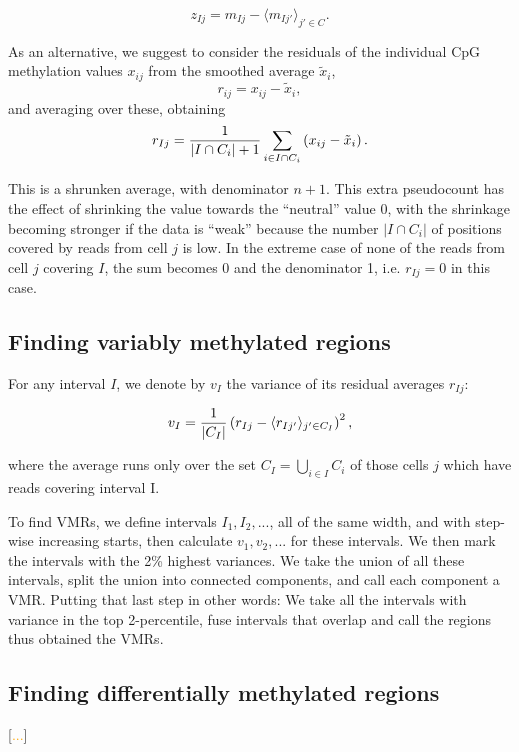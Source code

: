 \documentclass[twocolumn,10pt]{article}
\newcommand{\todo}[1]{[\textcolor{orange}{#1}]}
\begin{document}
$$ z_{Ij} = m_{Ij} - \langle m_{Ij'}\rangle_{j'\in C}.$$

As an alternative, we suggest to consider the residuals of the individual CpG methylation values $x_{ij}$ from the smoothed average $\tilde x_i$,
$$ r_{ij} = x_{ij} - \tilde x_i, $$
and averaging over these, obtaining
\begin{equation} 
r_{Ij} = \frac{\scriptsize{1}}{\scriptsize{|I\cap C_i|+1}}\sum_{i\in I\cap C_i}\left( x_{ij} - \tilde x_i \right).
\label{avgres}
\end{equation}

This is a shrunken average, with denominator $n+1$.
This extra pseudocount has the effect of shrinking the value towards the ``neutral'' value 0, with the shrinkage becoming stronger if the data is ``weak'' because the number $|I\cap C_i|$ of positions covered by reads from cell $j$  is low.
In the extreme case of none of the reads from cell $j$ covering $I$, the sum becomes 0 and the denominator 1, i.e.
$r_{Ij}=0$ in this case.

\subsection{Finding variably methylated regions}

For any interval $I$, we denote by $v_I$ the variance of its residual averages $r_{Ij}$:

$$ v_I = \frac{\scriptsize{1}}{\scriptsize{|C_I|}}\left( r_{Ij} - \langle r_{Ij'}\rangle_{j'\in C_I} \right)^2,$$

where the average runs only over the set $C_I=\bigcup_{i\in I}C_i$ of those cells $j$ which have reads covering interval I.

To find VMRs, we define intervals $I_1, I_2, ...$, all of the same width, and with step-wise increasing starts, then calculate $v_1, v_2, ...$ for these intervals.
We then mark the intervals with the 2\% highest variances.
We take the union of all these intervals, split the union into connected components, and call each component a VMR.
Putting that last step in other words: We take all the intervals with variance in the top 2-percentile, fuse intervals that overlap and call the regions thus obtained the VMRs.

\subsection{Finding differentially methylated regions}

\todo{...}
\end{document}
